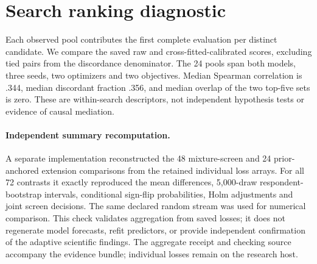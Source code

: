\documentclass[sigconf,anonymous]{aamas}
\begin{document}
\section{Search ranking diagnostic}
Each observed pool contributes the first complete evaluation per distinct
candidate. We compare the saved raw and cross-fitted-calibrated scores,
excluding tied pairs from the discordance denominator. The 24 pools span both
models, three seeds, two optimizers and two objectives. Median Spearman
correlation is .344, median discordant fraction .356, and median overlap of the
two top-five sets is zero. These are within-search descriptors, not independent
hypothesis tests or evidence of causal mediation.

\paragraph{Independent summary recomputation.}
A separate implementation reconstructed the 48 mixture-screen and 24
prior-anchored extension comparisons from the retained individual loss arrays.
For all 72 contrasts it exactly reproduced the mean differences, 5,000-draw
respondent-bootstrap intervals, conditional sign-flip probabilities, Holm
adjustments and joint screen decisions. The same declared random stream was
used for numerical comparison. This check validates aggregation from saved
losses; it does not regenerate model forecasts, refit predictors, or provide
independent confirmation of the adaptive scientific findings. The aggregate
receipt and checking source accompany the evidence bundle; individual losses
remain on the research host.
\end{document}

